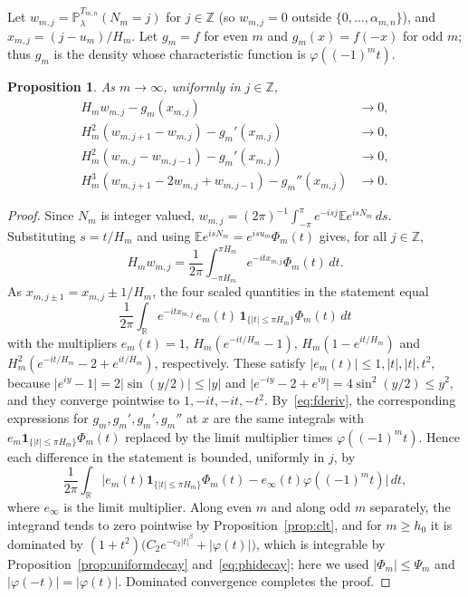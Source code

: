 \documentclass{amsart}
\newtheorem{proposition}[theorem]{Proposition}
\theoremstyle{definition}
\theoremstyle{remark}
\numberwithin{equation}{section}
\newcommand{\E}{\mathbb{E}}
\newcommand{\Prob}{\mathbb{P}}
\newcommand{\R}{\mathbb{R}}
\newcommand{\Z}{\mathbb{Z}}
\newcommand{\abs}[1]{\lvert #1\rvert}
\begin{document}
Let $w_{m,j}=\Prob^{T_{m,n}}_\lambda(N_m=j)$ for $j\in\Z$ (so $w_{m,j}=0$ outside $\{0,\dots,\alpha_{m,n}\}$), and $x_{m,j}=(j-u_m)/H_m$. Let $g_m=f$ for even $m$ and $g_m(x)=f(-x)$ for odd $m$; thus $g_m$ is the density whose characteristic function is $\varphi((-1)^mt)$.

\begin{proposition}\label{prop:llt}
As $m\to\infty$, uniformly in $j\in\Z$,
\begin{align*}
H_mw_{m,j}-g_m(x_{m,j})&\to0,\\
H_m^2(w_{m,j+1}-w_{m,j})-g_m'(x_{m,j})&\to0,\\
H_m^2(w_{m,j}-w_{m,j-1})-g_m'(x_{m,j})&\to0,\\
H_m^3(w_{m,j+1}-2w_{m,j}+w_{m,j-1})-g_m''(x_{m,j})&\to0 .
\end{align*}
\end{proposition}

\begin{proof}
Since $N_m$ is integer valued, $w_{m,j}=(2\pi)^{-1}\int_{-\pi}^{\pi}e^{-isj}\E e^{isN_m}\,ds$. Substituting $s=t/H_m$ and using $\E e^{isN_m}=e^{isu_m}\Phi_m(t)$ gives, for all $j\in\Z$,
\[
H_mw_{m,j}=\frac1{2\pi}\int_{-\pi H_m}^{\pi H_m}e^{-itx_{m,j}}\Phi_m(t)\,dt .
\]
As $x_{m,j\pm1}=x_{m,j}\pm1/H_m$, the four scaled quantities in the statement equal
\[
\frac1{2\pi}\int_\R e^{-itx_{m,j}}\,e_m(t)\,\mathbf 1_{\{\abs t\le\pi H_m\}}\Phi_m(t)\,dt
\]
with the multipliers $e_m(t)=1$, $H_m(e^{-it/H_m}-1)$, $H_m(1-e^{it/H_m})$ and $H_m^2(e^{-it/H_m}-2+e^{it/H_m})$, respectively. These satisfy $\abs{e_m(t)}\le1,\abs t,\abs t,t^2$, because $\abs{e^{iy}-1}=2\abs{\sin(y/2)}\le\abs y$ and $\abs{e^{-iy}-2+e^{iy}}=4\sin^2(y/2)\le y^2$, and they converge pointwise to $1,-it,-it,-t^2$. By~\eqref{eq:fderiv}, the corresponding expressions for $g_m,g_m',g_m',g_m''$ at $x$ are the same integrals with $e_m\mathbf 1_{\{\abs t\le\pi H_m\}}\Phi_m(t)$ replaced by the limit multiplier times $\varphi((-1)^mt)$. Hence each difference in the statement is bounded, uniformly in $j$, by
\[
\frac1{2\pi}\int_\R\bigl\lvert e_m(t)\mathbf 1_{\{\abs t\le\pi H_m\}}\Phi_m(t)-e_\infty(t)\varphi((-1)^mt)\bigr\rvert\,dt,
\]
where $e_\infty$ is the limit multiplier. Along even $m$ and along odd $m$ separately, the integrand tends to zero pointwise by Proposition~\ref{prop:clt}, and for $m\ge h_0$ it is dominated by $(1+t^2)\bigl(C_2e^{-c_2\abs t^\beta}+\abs{\varphi(t)}\bigr)$, which is integrable by Proposition~\ref{prop:uniformdecay} and~\eqref{eq:phidecay}; here we used $\abs{\Phi_m}\le\Psi_m$ and $\abs{\varphi(-t)}=\abs{\varphi(t)}$. Dominated convergence completes the proof.
\end{proof}
\end{document}
